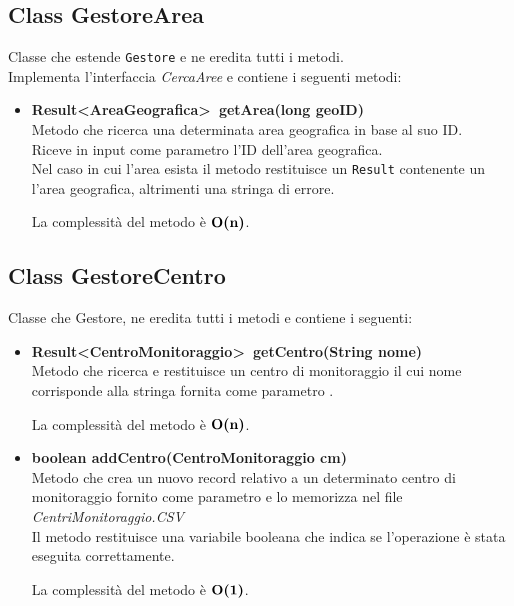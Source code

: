 \documentclass[a4paper, 12pt]{scrreprt}
\begin{document}
			\subsection{Class GestoreArea}
			Classe che estende \verb!Gestore! e ne eredita tutti i metodi.
			\\ Implementa l'interfaccia \textsl{CercaAree} e contiene i seguenti metodi:
			\begin{itemize}
				\item \textbf{Result\textless AreaGeografica\textgreater~getArea(long geoID)}
				\\Metodo che ricerca una determinata area geografica in base al suo ID.
				\\Riceve in input come parametro l'ID dell'area geografica.
				\\Nel caso in cui l'area esista il metodo restituisce un \verb!Result! contenente un l'area geografica, altrimenti una stringa di errore.

				La complessit\`a del metodo \`e $\mathbf{O}\textbf{(n)}$.
			\end{itemize}

			\subsection{Class GestoreCentro}
			Classe che Gestore, ne eredita tutti i metodi e contiene i seguenti:
			\begin{itemize}
				\item \textbf{Result\textless CentroMonitoraggio\textgreater~getCentro(String nome)}
				\\Metodo che ricerca e restituisce un centro di monitoraggio il cui nome corrisponde alla stringa fornita come parametro .

				La complessit\`a del metodo \`e $\mathbf{O}\textbf{(n)}$.

				\item \textbf {boolean addCentro(CentroMonitoraggio cm)}
				\\Metodo che crea un nuovo record relativo a un determinato centro di monitoraggio fornito come parametro e lo memorizza nel file \textsl{CentriMonitoraggio.CSV}
				\\Il metodo restituisce una variabile booleana che indica se l'operazione \`e stata eseguita correttamente.

				La complessit\`a del metodo \`e $\mathbf{O}\textbf{(1)}$.
			\end{itemize}
\end{document}
